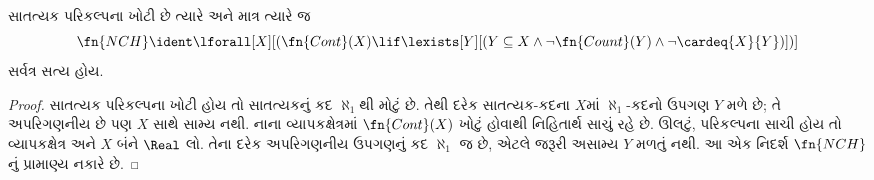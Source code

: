 \documentclass[../../../include/open-logic-section]{subfiles}
\begin{document}
\begin{prop}
સાતત્યક પરિકલ્પના ખોટી છે ત્યારે અને માત્ર ત્યારે જ
\[\fn{NCH} \ident
\lforall[X][(\fn{Cont}(X) \lif \lexists[Y][(Y \subseteq X \land \lnot
    \fn{Count}(Y) \land \lnot \cardeq{X}{Y})])]\]
સર્વત્ર સત્ય હોય.
\end{prop}
\begin{proof}
સાતત્યક પરિકલ્પના ખોટી હોય તો સાતત્યકનું કદ $\aleph_1$થી
મોટું છે. તેથી દરેક સાતત્યક-કદના $X$માં $\aleph_1$-કદનો
ઉપગણ $Y$ મળે છે; તે અપરિગણનીય છે પણ $X$ સાથે સામ્ય નથી.
નાના વ્યાપકક્ષેત્રમાં $\fn{Cont}(X)$ ખોટું હોવાથી નિહિતાર્થ
સાચું રહે છે. ઊલટું, પરિકલ્પના સાચી હોય તો વ્યાપકક્ષેત્ર અને
$X$ બંને $\Real$ લો. તેના દરેક અપરિગણનીય ઉપગણનું કદ
$\aleph_1$ જ છે, એટલે જરૂરી અસામ્ય $Y$ મળતું નથી.
આ એક નિદર્શ $\fn{NCH}$નું પ્રામાણ્ય નકારે છે.
\end{proof}
\end{document}
